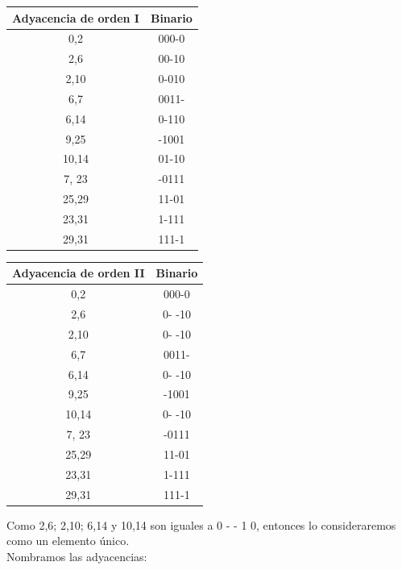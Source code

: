 \documentclass[a4paper,12pt]{article}
\begin{document}
\begin{enumerate}[label=\textcolor{teal}{\textbf{\arabic*.}}]
        \begin{table} [H]
            \centering
            \begin{tabular}{|c|c|}
                \hline
                Adyacencia de orden I & Binario\\ \hline
                0,2 & 000-0 \\ \hline 
                2,6 & 00-10 \\ \hline 
                2,10 & 0-010 \\ \hline
                6,7 & 0011- \\ \hline
                6,14 & 0-110 \\ \hline
                9,25 & -1001 \\ \hline 
                10,14 & 01-10 \\ \hline
                7, 23 & -0111 \\ \hline 
                25,29 & 11-01 \\ \hline 
                23,31 & 1-111 \\ \hline 
                29,31 & 111-1 \\ \hline 
            \end{tabular}
        \end{table}

        \begin{table} [H]
            \centering
            \begin{tabular}{|c|c|}
                \hline
                Adyacencia de orden II & Binario\\ \hline
                0,2 & 000-0 \\ \hline 
                \rowcolor{yellow!50} 2,6 & 0- -10 \\ \hline 
                \rowcolor{cyan} 2,10 & 0- -10 \\ \hline
                6,7 & 0011- \\ \hline
                \rowcolor{cyan} 6,14 & 0- -10 \\ \hline
                9,25 & -1001 \\ \hline 
                \rowcolor{yellow!50} 10,14 & 0- -10 \\ \hline
                7, 23 & -0111 \\ \hline 
                25,29 & 11-01 \\ \hline 
                23,31 & 1-111 \\ \hline 
                29,31 & 111-1 \\ \hline 
            \end{tabular}
        \end{table}
        Como 2,6; 2,10; 6,14 y 10,14 son iguales a 0 - - 1 0, entonces lo consideraremos como un elemento único.\\
        Nombramos las adyacencias: \\


\end{enumerate}
\end{document}
